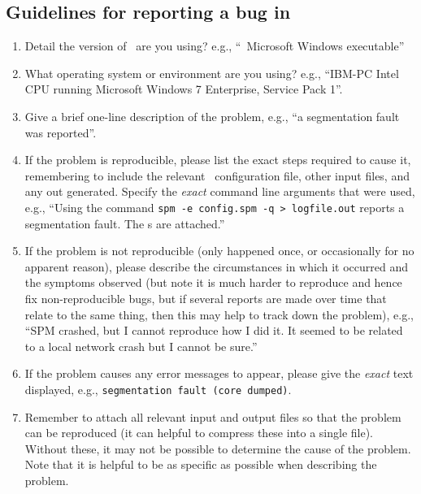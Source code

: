\subsection{Guidelines for reporting a bug in \SPM\label{sec:error-guidelines}}

\begin{enumerate}
\item Detail the version of \SPM\ are you using? e.g., ``\SPM\ \VER Microsoft Windows executable''

\item What operating system or environment are you using? e.g., ``IBM-PC Intel CPU running Microsoft Windows 7 Enterprise, Service Pack 1''.

\item Give a brief one-line description of the problem, e.g., ``a segmentation fault was reported''.

\item If the problem is reproducible, please list the exact steps required to cause it, remembering to include the relevant \SPM\ configuration file, other input files, and any out generated. Specify the \emph{exact} command line arguments that were used, e.g., ``Using the command \texttt{spm -e config.spm -q > logfile.out} reports a segmentation fault. The \config s are attached.''

\item If the problem is not reproducible (only happened once, or occasionally for no apparent reason), please describe the circumstances in which it occurred and the symptoms observed (but note it is much harder to reproduce and hence fix non-reproducible bugs, but if several reports are made over time that relate to the same thing, then this may help to track down the problem), e.g., ``SPM crashed, but I cannot reproduce how I did it. It seemed to be related to a local network crash but I cannot be sure.''

\item If the problem causes any error messages to appear, please give the \emph{exact} text displayed, e.g., \texttt{segmentation fault (core dumped)}.

\item Remember to attach all relevant input and output files so that the problem can be reproduced (it can helpful to compress these into a single file). Without these, it may not be possible to determine the cause of the problem. Note that it is helpful to be as specific as possible when describing the problem.

\end{enumerate}
